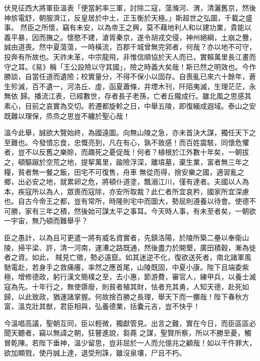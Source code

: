 \begin{pinyinscope}
 伏見征西大將軍臣溫表「便當躬率三軍，討除二寇，蕩滌河、渭，清灑舊京，然後神旂電舒，朝服濟江，反皇居於中土，正玉衡於天極。」斯超世之弘圖，千載之盛事。
 然臣之所懷，竊有未安，以為帝王之興，莫不藉地利人和以建功業，貴能以義平暴，因而撫之。懷愍不建，滄胥秦京，遂令胡戎交侵，神州絕綱，土崩之釁，誠由道喪。然中夏蕩蕩，一時橫流，百郡千城曾無完郛者，何哉？亦以地不可守，投奔有所故也。天祚未革，中宗龍飛，非惟信順協於天人而已，實賴萬里長江畫而守之耳。《易》稱「王公設險以守其國」，險之時義大矣哉！斯已然之明效也。今作勝談，自當任道而遺險；校實量分，不得不保小以固存。自喪亂已來六十餘年，蒼生殄滅，百不遺一，河洛丘、虛，函夏蕭條，井堙木刊，阡陌夷滅，生理茫茫，永無依
 歸。播流江表，已經數世，存者長子老孫，亡者丘隴成行。雖北風之思感其素心，目前之哀實為交切。若遷都旋軫之日，中舉五陵，即復緬成遐域。泰山之安既難以理保，烝烝之思豈不纏於聖心哉！



 溫今此舉，誠欲大覽始終，為國遠圖。向無山陵之急，亦未首決大謀，獨任天下之至難也。今發憤忘食，忠慨亮到，凡在有心，孰不致感！而百姓震駭，同懷危懼者，豈不以反舊之樂賒，而趣死之憂促哉！何者？植根於江外數十年矣，一朝拔之，頓驅踧於空荒之地，提挈萬里，踰險浮深，離墳墓，棄生業，富者無三年之糧，貧者無一餐之飯，田宅不可復售，舟車
 無從而得，捨安樂之國，適習亂之鄉，出必安之地，就累卵之危，將頓仆道塗，飄溺江川，僅有達者。夫國以人為本，疾寇所以為人，眾喪而寇除，亦安所取裁？此仁者所宜哀矜，國家所宜深慮也。自古今帝王之都，豈有常所，時隆則宅中而圖大，勢屈則遵養以待會。使德不可勝，家有三年之積，然後始可謀太平之事耳。今天時人事，有未至者矣，一朝欲一宇宙，無乃頓而難舉乎？



 臣之愚計，以為且可更遣一將有威名資實者，先鎮洛陽，於陵所築二壘以奉衛山陵，掃平梁、許，清一河南，運漕之路既通，然後盡力於開墾，廣田積穀，漸為徙者之資。如此，
 賊見亡徵，勢必遠竄。如其迷逆不化，復欲送死者，南北諸軍風馳電赴，若身手之救痛癢，率然之應首尾，山陵既固，中夏小康。陛下且端委紫極，增修德政，躬行漢文簡樸之至，去小惠，節游費，審官人，練甲兵，以養士滅寇為先。十年行之，無使隳廢，則貧者殖其財，怯者充其勇，人知天德，赴死如歸，以此致政，猶運諸掌握。何故捨百勝之長理，舉天下而一擲哉！陛下春秋方富，溫克壯其猷，君臣相與，弘養德業，括囊元吉，豈不快乎！



 今溫唱高議，聖朝互同，臣以輕微，獨獻管見。出言之難，實在今日，而臣區區必聞天聽者，竊以無諱之朝，狂瞽進說，芻蕘
 之謀，聖賢所察，所以不勝至憂，觸冒乾陳。若陛下垂神，溫少留思，豈非屈於一人而允億兆之顧哉！如以干忤罪大，欲加顯戮，使丹誠上達，退受刑誅，雖沒泉壤，尸且不朽。




\end{pinyinscope}
